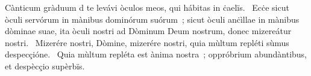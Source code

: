{ Cànticum gràduum}
{%
d te levávi òculos meos, qui hábitas in ċaelïs. 
~Ecċe sicut òculi servórum in mànibus dominórum suórum~; sicut òculi anċìllae in mànibus dòminae suae, ita òculi nostri ad Dòminum Deum nostrum, donec mizereátur nostri. 
~Mizerére nostri, Dòmine, mizerére nostri, quia mùltum repléti sùmus despecçióne. 
~Quia mùltum repléta est ànima nostra~; oppróbrium abundàntibus, et despècçio supèrbïs. 
}
